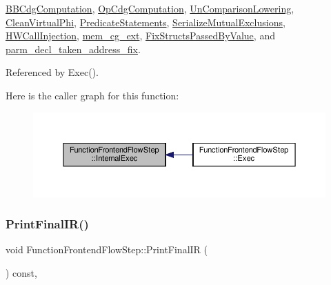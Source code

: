 \hyperlink{classBBCdgComputation_a104af4ec42e6e2057cb89385dd768f02}{B\+B\+Cdg\+Computation}, \hyperlink{classOpCdgComputation_ae450186646ed8dea812526b558b5263a}{Op\+Cdg\+Computation}, \hyperlink{classUnComparisonLowering_ac4701f059a92948a4b7a5157b53a36df}{Un\+Comparison\+Lowering}, \hyperlink{classCleanVirtualPhi_aa42a723e56786320db6ba7539aa719ab}{Clean\+Virtual\+Phi}, \hyperlink{classPredicateStatements_aa2e79d8893443b3126d0e356aeb7f924}{Predicate\+Statements}, \hyperlink{classSerializeMutualExclusions_a7b0969d1c788283b2c103a5b64d44cca}{Serialize\+Mutual\+Exclusions}, \hyperlink{classHWCallInjection_a7c601b025163eef724680f402f8ff6c0}{H\+W\+Call\+Injection}, \hyperlink{classmem__cg__ext_aec306532229120aabaacf2a9602648c2}{mem\+\_\+cg\+\_\+ext}, \hyperlink{classFixStructsPassedByValue_a30d76d47407cac74933b87bca8bb4292}{Fix\+Structs\+Passed\+By\+Value}, and \hyperlink{classparm__decl__taken__address__fix_afeaf66df2e6c884ca04ae5410298d052}{parm\+\_\+decl\+\_\+taken\+\_\+address\+\_\+fix}.



Referenced by Exec().

Here is the caller graph for this function\+:
\nopagebreak
\begin{figure}[H]
\begin{center}
\leavevmode
\includegraphics[width=350pt]{d8/d0a/classFunctionFrontendFlowStep_a00612f7fb9eabbbc8ee7e39d34e5ac68_icgraph}
\end{center}
\end{figure}
\mbox{\label{classFunctionFrontendFlowStep_abe2dc98fddb94bebf12a91e8c78f9dcc}} 
\subsubsection{\texorpdfstring{Print\+Final\+I\+R()}{PrintFinalIR()}}
{\footnotesize\ttfamily void Function\+Frontend\+Flow\+Step\+::\+Print\+Final\+IR (\begin{DoxyParamCaption}{ }\end{DoxyParamCaption}) const\hspace{0.3cm}{\ttfamily [override]}, {\ttfamily [virtual]}}



